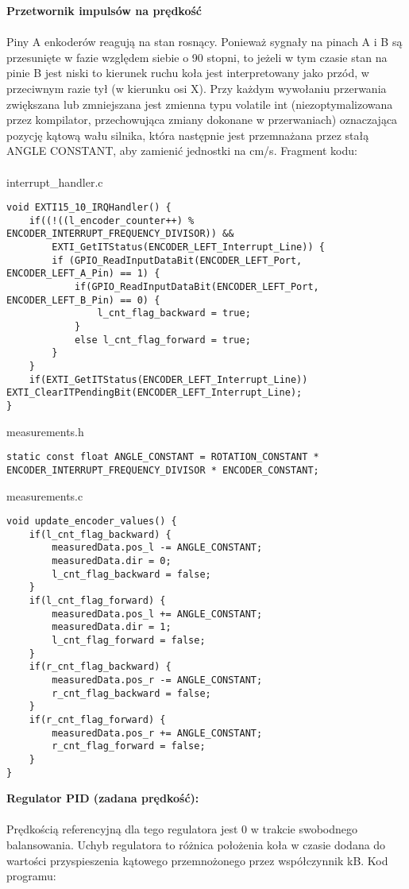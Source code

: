 \documentclass[a4paper,12pt,twoside,openany]{report}
\begin{document}
\newpage
\noindent \textbf{Przetwornik impulsów na prędkość}\\
\\
Piny A enkoderów reagują na stan rosnący. Ponieważ sygnały na pinach A i B są przesunięte w fazie względem siebie o 90 stopni, to jeżeli w tym czasie stan na pinie B jest niski to kierunek ruchu koła jest interpretowany jako przód, w przeciwnym razie tył (w kierunku osi X). Przy każdym wywołaniu przerwania zwiększana lub zmniejszana jest zmienna typu volatile int (niezoptymalizowana przez kompilator, przechowująca zmiany dokonane w przerwaniach) oznaczająca pozycję kątową wału silnika, która następnie jest przemnażana przez stałą ANGLE CONSTANT, aby zamienić jednostki na cm/s. Fragment kodu:\\
\\
\noindent interrupt\_handler.c
\begin{lstlisting}[style=customc]
void EXTI15_10_IRQHandler() {
	if((!((l_encoder_counter++) % ENCODER_INTERRUPT_FREQUENCY_DIVISOR)) && 
        EXTI_GetITStatus(ENCODER_LEFT_Interrupt_Line)) {
		if (GPIO_ReadInputDataBit(ENCODER_LEFT_Port, ENCODER_LEFT_A_Pin) == 1) {
			if(GPIO_ReadInputDataBit(ENCODER_LEFT_Port, ENCODER_LEFT_B_Pin) == 0) {
            	l_cnt_flag_backward = true;
            }
			else l_cnt_flag_forward = true;
		}
	}
	if(EXTI_GetITStatus(ENCODER_LEFT_Interrupt_Line)) EXTI_ClearITPendingBit(ENCODER_LEFT_Interrupt_Line);
}
\end{lstlisting}
measurements.h
\begin{lstlisting}[style=customc]
static const float ANGLE_CONSTANT = ROTATION_CONSTANT * ENCODER_INTERRUPT_FREQUENCY_DIVISOR * ENCODER_CONSTANT;
\end{lstlisting}
measurements.c
\begin{lstlisting}[style=customc]
void update_encoder_values() {
	if(l_cnt_flag_backward) {
		measuredData.pos_l -= ANGLE_CONSTANT;
		measuredData.dir = 0;
		l_cnt_flag_backward = false;
	}
	if(l_cnt_flag_forward) {
		measuredData.pos_l += ANGLE_CONSTANT;
		measuredData.dir = 1;
		l_cnt_flag_forward = false;
	}
	if(r_cnt_flag_backward) {
		measuredData.pos_r -= ANGLE_CONSTANT;
		r_cnt_flag_backward = false;
	}
	if(r_cnt_flag_forward) {
		measuredData.pos_r += ANGLE_CONSTANT;
		r_cnt_flag_forward = false;
	}
}
\end{lstlisting}
\textbf{Regulator PID (zadana prędkość):}\\
\\
Prędkością referencyjną dla tego regulatora jest 0 w trakcie swobodnego balansowania. Uchyb regulatora to różnica położenia koła w czasie dodana do wartości przyspieszenia kątowego przemnożonego przez współczynnik kB. Kod programu:\\
\end{document}
